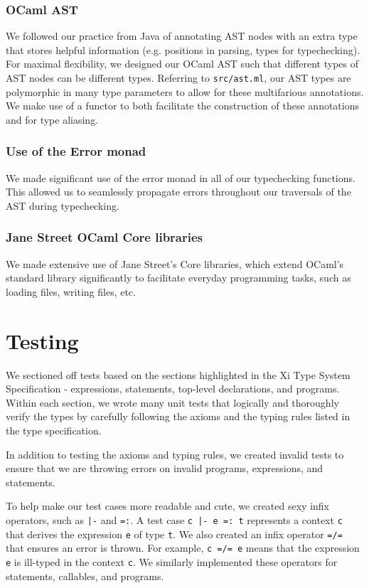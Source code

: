 \documentclass{hw}
\begin{document}
\subsubsection{OCaml AST}
We followed our practice from Java of annotating AST nodes with an extra type that
stores helpful information (e.g. positions in parsing, types for typechecking). For
maximal flexibility, we designed our OCaml AST such that different types of AST nodes
can be different types. Referring to \texttt{src/ast.ml}, our AST types are polymorphic
in many type parameters to allow for these multifarious annotations. We make use of a
functor to both facilitate the construction of these annotations and for type aliasing.

\subsubsection{Use of the Error monad}
We made significant use of the error monad in all of our typechecking functions. This
allowed us to seamlessly propagate errors throughout our traversals of the AST during
typechecking.

\subsubsection{Jane Street OCaml Core libraries}
We made extensive use of Jane Street's Core libraries, which extend OCaml's standard
library significantly to facilitate everyday programming tasks, such as loading files,
writing files, etc.

\section{Testing}\label{sec:testing}
We sectioned off tests based on the sections highlighted in the Xi Type System Specification - expressions, statements, top-level declarations, and programs. Within each section, we wrote many unit tests that logically and thoroughly verify the types by carefully following the axioms and the typing rules listed in the type specification.

In addition to testing the axioms and typing rules, we created invalid tests to ensure that we are throwing errors on invalid programs, expressions, and statements.

To help make our test cases more readable and cute, we created sexy infix operators, such as \texttt{|-} and \texttt{=:}. A test case \texttt{c |- e =: t} represents a context \texttt{c} that derives the expression \texttt{e} of type \texttt{t}. We also created an infix operator \texttt{=/=} that ensures an error is thrown. For example, \texttt{c =/= e} means that the expression \texttt{e} is ill-typed in the context \texttt{c}. We similarly implemented these operators for statements, callables, and programs.
\end{document}
